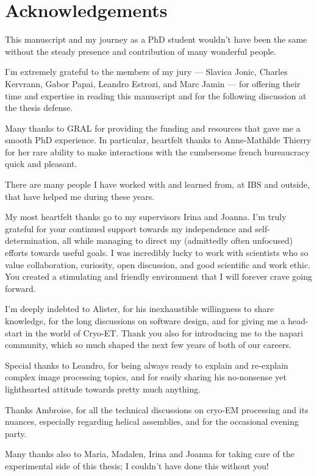 \chapter{Acknowledgements}

This manuscript and my journey as a PhD student wouldn't have been the same without the steady presence and contribution of many wonderful people.

\bigskip

I'm extremely grateful to the members of my jury --- Slavica Jonic, Charles Kervrann, Gabor Papai, Leandro Estrozi, and Marc Jamin --- for offering their time and expertise in reading this manuscript and for the following discussion at the thesis defense.

Many thanks to GRAL for providing the funding and resources that gave me a smooth PhD experience. In particular, heartfelt thanks to Anne-Mathilde Thierry for her rare ability to make interactions with the cumbersome french bureaucracy quick and pleasant.

\bigskip

There are many people I have worked with and learned from, at IBS and outside, that have helped me during these years.

My most heartfelt thanks go to my supervisors Irina and Joanna. I'm truly grateful for your continued support towards my independence and self-determination, all while managing to direct my (admittedly often unfocused) efforts towards useful goals. I was incredibly lucky to work with scientists who so value collaboration, curiosity, open discussion, and good scientific and work ethic. You created a stimulating and friendly environment that I will forever crave going forward.

I'm deeply indebted to Alister, for his inexhaustible willingness to share knowledge, for the long discussions on software design, and for giving me a head-start in the world of Cryo-ET. Thank you also for introducing me to the napari community, which so much shaped the next few years of both of our careers. 

Special thanks to Leandro, for being always ready to explain and re-explain complex image processing topics, and for easily sharing his no-nonsense yet lighthearted attitude towards pretty much anything.

Thanks Ambroise, for all the technical discussions on cryo-EM processing and its nuances, especially regarding helical assemblies, and for the occasional evening party.

Many thanks also to Maria, Madalen, Irina and Joanna for taking care of the experimental side of this thesis; I couldn't have done this without you!

